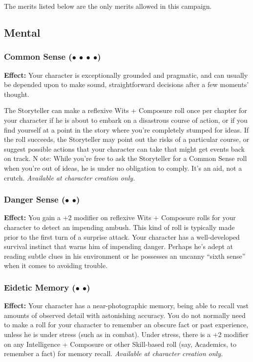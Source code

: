 \documentclass["../Misguided by Starlight.tex"]{subfiles}
\begin{document}

The merits listed below are the only merits allowed in this campaign.

\subsection{Mental}
	\subsubsection{Common Sense ($\bullet$ $\bullet$ $\bullet$ $\bullet$)} %
		\textbf{Effect:} Your character is exceptionally grounded and pragmatic, and can usually be depended upon to make sound, straightforward decisions after a few moments' thought.
		
		The Storyteller can make a reflexive Wits + Composure roll once per chapter for your character if he is about to embark on a disastrous course of action, or if you find yourself at a point in the story where you're completely stumped for ideas. If the roll succeeds, the Storyteller may point out the risks of a particular course, or suggest possible actions that your character can take that might get events back on track. N ote: While you're free to ask the Storyteller for a Common Sense roll when you're out of ideas, he is under no obligation to comply. It's an aid, not a crutch. \emph{Available at character creation only.}
		
	\subsubsection{Danger Sense ($\bullet$ $\bullet$)} %
		\textbf{Effect:} You gain a +2 modifier on reflexive Wits + Composure rolls for your character to detect an impending ambush. This kind of roll is typically made prior to the first turn of a surprise attack. Your character has a well-developed survival instinct that warns him of impending danger. Perhaps he's adept at reading subtle clues in his environment or he possesses an uncanny ``sixth sense'' when it comes to avoiding trouble.
	
	\subsubsection{Eidetic Memory ($\bullet$ $\bullet$)} %
		\textbf{Effect:} Your character has a near-photographic memory, being able to recall vast amounts of observed detail with astonishing accuracy. You do not normally need to make a roll for your character to remember an obscure fact or past experience, unless he is under stress (such as in combat). Under stress, there is a +2 modifier on any Intelligence + Composure or other Skill-based roll (say, Academics, to remember a fact) for memory recall. \emph{Available at character creation only.}
\end{document}
